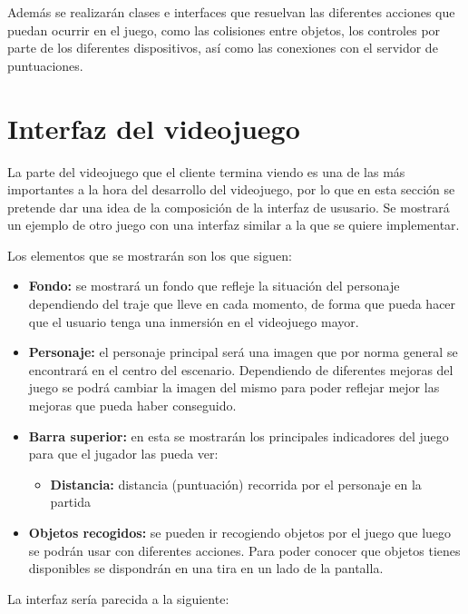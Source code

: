 \documentclass[palatino]{apuntes}
\begin{document}
Además se realizarán clases e interfaces que resuelvan las diferentes acciones que puedan ocurrir en el juego, como las colisiones entre objetos, los controles por parte de los diferentes dispositivos, así como las conexiones con el servidor de puntuaciones.


\section{Interfaz del videojuego}
La parte del videojuego que el cliente termina viendo es una de las más importantes a la hora del desarrollo del videojuego, por lo que en esta sección se pretende dar una idea de la composición de la interfaz de ususario. Se mostrará un ejemplo de otro juego con una interfaz similar a la que se quiere implementar.

Los elementos que se mostrarán son los que siguen:
\begin{itemize}
	\item \textbf{Fondo:} se mostrará un fondo que refleje la situación del personaje dependiendo del traje que lleve en cada momento, de forma que pueda hacer que el usuario tenga una inmersión en el videojuego mayor.
	\item \textbf{Personaje:} el personaje principal será una imagen que por norma general se encontrará en el centro del escenario. Dependiendo de diferentes mejoras del juego se podrá cambiar la imagen del mismo para poder reflejar mejor las mejoras que pueda haber conseguido.
	\item \textbf{Barra superior:} en esta se mostrarán los principales indicadores del juego para que el jugador las pueda ver:
		\begin{itemize}
			\item \textbf{Distancia:} distancia (puntuación) recorrida por el personaje en la partida
			
		\end{itemize}
	\item \textbf{Objetos recogidos:} se pueden ir recogiendo objetos por el juego que luego se podrán usar con diferentes acciones. Para poder conocer que objetos tienes disponibles se dispondrán en una tira en un lado de la pantalla.
	
\end{itemize}

La interfaz sería parecida a la siguiente:
\end{document}
